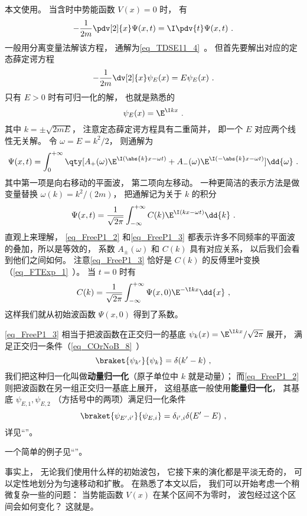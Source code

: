 

本文使用。 当含时中势能函数 $V(x) = 0$ 时， 有
\begin{equation}\label{eq_FreeP1_1}
-\frac{1}{2m}\pdv[2]{x}\Psi(x,t) = \I \pdv{t} \Psi(x,t)~.
\end{equation}
一般用分离变量法解该方程， 通解为\autoref{eq_TDSE11_4}~。 但首先要解出对应的定态薛定谔方程
\begin{equation}
-\frac{1}{2m}\dv[2]{x}\psi_E(x) = E \psi_E(x)~.
\end{equation}
只有 $E > 0$ 时有可归一化的解， 也就是熟悉的
\begin{equation}
\psi_E(x) = \E^{\I k x}~.
\end{equation}
其中 $k = \pm\sqrt{2mE}$， 注意定态薛定谔方程具有二重简并， 即一个 $E$ 对应两个线性无关解。 令 $\omega = E = k^2/2$， 则通解为
\begin{equation}\label{eq_FreeP1_2}
\Psi(x,t) = \int_{0}^{+\infty} \qty[A_+(\omega) \E^{\I (\abs{k}x - \omega t)} + A_-(\omega) \E^{\I (-\abs{k}x - \omega t)}] \dd{\omega}~.
\end{equation}
其中第一项是向右移动的平面波， 第二项向左移动。 一种更简洁的表示方法是做变量替换 $\omega(k) = k^2/(2m)$， 把通解记为关于 $k$ 的积分
\begin{equation}\label{eq_FreeP1_3}
\Psi(x,t) = \frac{1}{\sqrt{2\pi}} \int_{-\infty}^{+\infty} C(k) \E^{\I (k x - \omega t)} \dd{k}~.
\end{equation}
直观上来理解， \autoref{eq_FreeP1_2} 和\autoref{eq_FreeP1_3} 都表示许多不同频率的平面波的叠加，所以是等效的， 系数 $A_\pm(\omega)$ 和 $C(k)$ 具有对应关系， 以后我们会看到他们之间如何。 注意\autoref{eq_FreeP1_3} 恰好是 $C(k)$ 的反傅里叶变换（\autoref{eq_FTExp_1}~）。 当 $t = 0$ 时有
\begin{equation}
C(k) = \frac{1}{\sqrt{2\pi}} \int_{-\infty}^{+\infty} \Psi(x,0) \E^{-\I k x} \dd{x}~,
\end{equation}
这样我们就从初始波函数 $\Psi(x,0)$ 得到了系数。

\autoref{eq_FreeP1_3} 相当于把波函数在正交归一的基底 $\psi_k(x) = \E^{\I kx}/\sqrt{2\pi}$ 展开， 满足正交归一条件（\autoref{eq_COrNoB_8}~）
\begin{equation}
\braket{\psi_{k'}}{\psi_k} = \delta(k' - k)~,
\end{equation}
我们把这种归一化叫做\textbf{动量归一化}（原子单位中 $k$ 就是动量）； 而\autoref{eq_FreeP1_2} 则把波函数在另一组正交归一基底上展开， 这组基底一般使用\textbf{能量归一化}， 其基底 $\psi_{E,1}, \psi_{E,2}$ （方括号中的两项）满足归一化条件
\begin{equation}
\braket{\psi_{E',i'}}{\psi_{E,i}} = \delta_{i',i}\delta(E' - E)~,
\end{equation}
详见“”。

一个简单的例子见“”。

事实上， 无论我们使用什么样的初始波包， 它接下来的演化都是平淡无奇的， 可以定性地划分为匀速移动和扩散。 在熟悉了本文以后， 我们可以开始考虑一个稍微复杂一些的问题： 当势能函数 $V(x)$ 在某个区间不为零时， 波包经过这个区间会如何变化？ 这就是。
